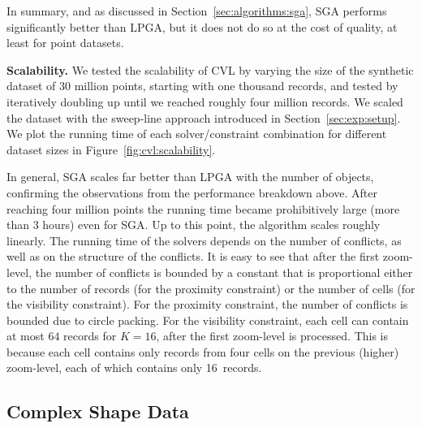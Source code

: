 \documentclass[11pt, oneside]{report}
\newcommand{\minisec}[1]{\noindent\textbf{#1.}}
\begin{document}
{In summary, and as discussed in Section~\ref{sec:algorithms:sga}, SGA performs significantly better than LPGA, but it does not do so at the cost of quality, at least for point datasets.


\minisec{Scalability}
We tested the scalability of CVL by varying the size of the synthetic dataset of 30 million points, starting with one thousand records, and tested by iteratively doubling up until we reached roughly four million records. We scaled the dataset with the sweep-line approach introduced in Section~\ref{sec:exp:setup}. We plot the running time of each solver/constraint combination for different dataset sizes in Figure~\ref{fig:cvl:scalability}.

In general, SGA scales far better than LPGA with the number of objects, confirming the observations from the performance breakdown above. After reaching four million points the running time became prohibitively large (more than 3 hours) even for SGA. Up to this point, the algorithm scales roughly linearly. The running time of the solvers depends on the number of conflicts, as well as on the structure of the conflicts. It is easy to see that after the first zoom-level, the number of conflicts is bounded by a constant that is proportional either to the number of records (for the proximity constraint) or the number of cells (for the visibility constraint). For the proximity constraint, the number of conflicts is bounded due to circle packing. For the visibility constraint, each cell can contain at most $64$ records for $K=16$, after the first zoom-level is processed. This is because each cell contains only records from four cells on the previous (higher) zoom-level, each of which contains only 16~records.



\subsection{Complex Shape Data}
\label{sec:exp:complex:shapes}

}
\end{document}
